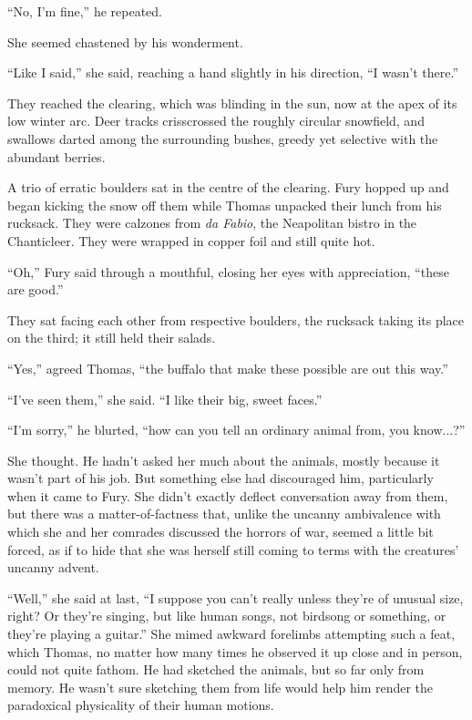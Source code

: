 \documentclass[11pt,a5paper]{article}
\begin{document}
``No, I'm fine,'' he repeated.

She seemed chastened by his wonderment.

``Like I said,'' she said, reaching a hand slightly in his direction, ``I wasn't there.''

They reached the clearing, which was blinding in the sun, now at the apex of its low winter arc. Deer tracks crisscrossed the roughly circular snowfield, and swallows darted among the surrounding bushes, greedy yet selective with the abundant berries.

A trio of erratic boulders sat in the centre of the clearing. Fury hopped up and began kicking the snow off them while Thomas unpacked their lunch from his rucksack. They were calzones from \emph{da Fabio}, the Neapolitan bistro in the Chanticleer. They were wrapped in copper foil and still quite hot.

``Oh,'' Fury said through a mouthful, closing her eyes with appreciation, ``these are good.''

They sat facing each other from respective boulders, the rucksack taking its place on the third; it still held their salads.

``Yes,'' agreed Thomas, ``the buffalo that make these possible are out this way.''

``I've seen them,'' she said. ``I like their big, sweet faces.''

``I'm sorry,'' he blurted, ``how can you tell an ordinary animal from, you know...?''

She thought. He hadn't asked her much about the animals, mostly because it wasn't part of his job. But something else had discouraged him, particularly when it came to Fury. She didn't exactly deflect conversation away from them, but there was a matter-of-factness that, unlike the uncanny ambivalence with which she and her comrades discussed the horrors of war, seemed a little bit forced, as if to hide that she was herself still coming to terms with the creatures' uncanny advent.

``Well,'' she said at last, ``I suppose you can't really unless they're of unusual size, right? Or they're singing, but like human songs, not birdsong or something, or they're playing a guitar.'' She mimed awkward forelimbs attempting such a feat, which Thomas, no matter how many times he observed it up close and in person, could not quite fathom. He had sketched the animals, but so far only from memory. He wasn't sure sketching them from life would help him render the paradoxical physicality of their human motions.
\end{document}
